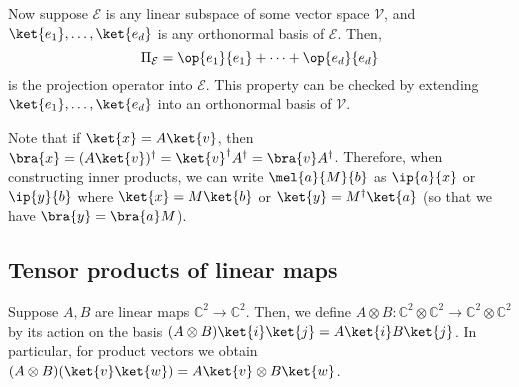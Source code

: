 Now suppose $\mathcal E$ is any linear subspace of some vector space $\mathcal V$, and $\ket{e_1}, \dots, \ket{e_d}$ is any orthonormal basis of $\mathcal E$.
Then,
\[ \Pi_{\mathcal E} = \op{e_1}{e_1} + \dots + \op{e_d}{e_d} \]
is the projection operator into $\mathcal E$.
This property can be checked by extending $\ket{e_1}, \dots, \ket{e_d}$ into an orthonormal basis of $\mathcal V$.

Note that if $\ket{x} = A \ket{v}$, then $\bra{x} = (A \ket{v})^\dagger = \ket{v}^\dagger A^\dagger = \bra{v} A^\dagger$.
Therefore, when constructing inner products, we can write $\mel{a}{M}{b}$ as $\ip{a}{x}$ or $\ip{y}{b}$ where $\ket{x} = M \ket{b}$ or $\ket{y} = M^\dagger \ket{a}$ (so that we have $\bra{y} = \bra{a} M$).

\subsection{Tensor products of linear maps}
Suppose $A, B$ are linear maps $\mathbb C^2 \to \mathbb C^2$.
Then, we define $A \otimes B \colon \mathbb C^2 \otimes \mathbb C^2 \to \mathbb C^2 \otimes \mathbb C^2$ by its action on the basis $(A \otimes B)\ket{i} \ket{j} = A \ket{i} B \ket{j}$.
In particular, for product vectors we obtain $(A \otimes B) (\ket{v} \ket{w}) = A \ket{v} \otimes B \ket{w}$.

